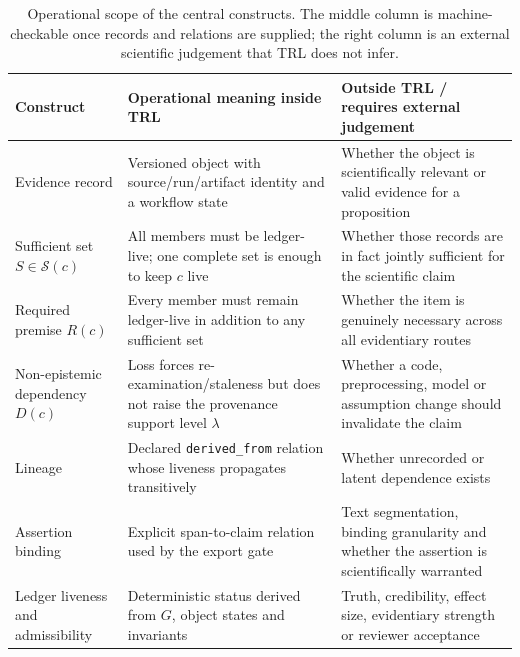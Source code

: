 \documentclass[cmc,article,submit,moreauthors,pdftex]{Definitions/tsp}
\begin{document}
\begin{table}[t]
\centering
\caption{Operational scope of the central constructs. The middle column is machine-checkable once records and relations are supplied; the right column is an external scientific judgement that TRL does not infer.}
\label{tab:constructs}
\scriptsize
\begin{tabularx}{\textwidth}{p{2.5cm}>{\raggedright\arraybackslash}X>{\raggedright\arraybackslash}X}
\toprule
Construct & Operational meaning inside TRL & Outside TRL / requires external judgement \\
\midrule
Evidence record & Versioned object with source/run/artifact identity and a workflow state & Whether the object is scientifically relevant or valid evidence for a proposition \\
Sufficient set $S\in\mathcal{S}(c)$ & All members must be ledger-live; one complete set is enough to keep $c$ live & Whether those records are in fact jointly sufficient for the scientific claim \\
Required premise $R(c)$ & Every member must remain ledger-live in addition to any sufficient set & Whether the item is genuinely necessary across all evidentiary routes \\
Non-epistemic dependency $D(c)$ & Loss forces re-examination/staleness but does not raise the provenance support level $\lambda$ & Whether a code, preprocessing, model or assumption change should invalidate the claim \\
Lineage & Declared \texttt{derived\_from} relation whose liveness propagates transitively & Whether unrecorded or latent dependence exists \\
Assertion binding & Explicit span-to-claim relation used by the export gate & Text segmentation, binding granularity and whether the assertion is scientifically warranted \\
Ledger liveness and admissibility & Deterministic status derived from $G$, object states and invariants & Truth, credibility, effect size, evidentiary strength or reviewer acceptance \\
\bottomrule
\end{tabularx}
\end{table}
\end{document}
